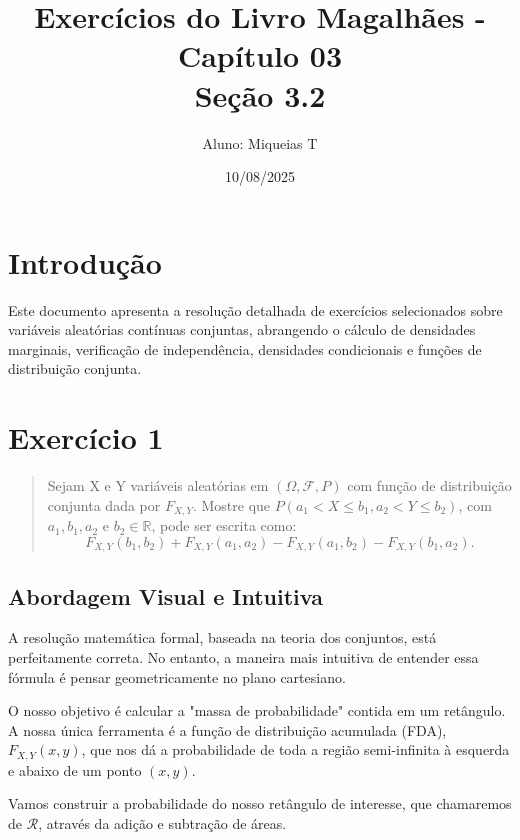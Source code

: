 \documentclass[12pt]{article}
\title{Exercícios do Livro Magalhães - Capítulo 03\\\large{Seção 3.2}}
\author{Aluno: Miqueias T}
\date{10/08/2025}
\begin{document}
\maketitle

\section*{Introdução}
Este documento apresenta a resolução detalhada de exercícios selecionados sobre variáveis aleatórias contínuas conjuntas, abrangendo o cálculo de densidades marginais, verificação de independência, densidades condicionais e funções de distribuição conjunta.

\section*{Exercício 1}

\begin{quote}
Sejam X e Y variáveis aleatórias em $(\Omega, \mathcal{F}, P)$ com função de distribuição conjunta dada por $F_{X,Y}$. Mostre que $P(a_1 < X \le b_1, a_2 < Y \le b_2)$, com $a_1, b_1, a_2$ e $b_2 \in \mathbb{R}$, pode ser escrita como:
\[ F_{X,Y}(b_1, b_2) + F_{X,Y}(a_1, a_2) - F_{X,Y}(a_1, b_2) - F_{X,Y}(b_1, a_2). \]
\end{quote}

\hrulefill

\subsection*{Abordagem Visual e Intuitiva}

A resolução matemática formal, baseada na teoria dos conjuntos, está perfeitamente correta. No entanto, a maneira mais intuitiva de entender essa fórmula é pensar geometricamente no plano cartesiano.

O nosso objetivo é calcular a "massa de probabilidade" contida em um retângulo. A nossa única ferramenta é a função de distribuição acumulada (FDA), $F_{X,Y}(x,y)$, que nos dá a probabilidade de toda a região semi-infinita à esquerda e abaixo de um ponto $(x,y)$.

Vamos construir a probabilidade do nosso retângulo de interesse, que chamaremos de $\mathcal{R}$, através da adição e subtração de áreas.
\end{document}
